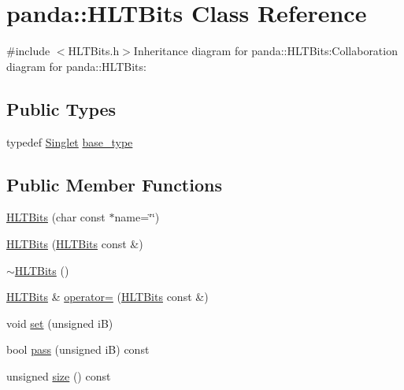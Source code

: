 \hypertarget{classpanda_1_1HLTBits}{
\section{panda::HLTBits Class Reference}
\label{classpanda_1_1HLTBits}
}


{\ttfamily \#include $<$HLTBits.h$>$}Inheritance diagram for panda::HLTBits:Collaboration diagram for panda::HLTBits:\subsection*{Public Types}
\begin{DoxyCompactItemize}
\item 
typedef \hyperlink{classpanda_1_1Singlet}{Singlet} \hyperlink{classpanda_1_1HLTBits_a0b3fb69a61a8c9ec407a7c066d40f5dc}{base\_\-type}
\end{DoxyCompactItemize}
\subsection*{Public Member Functions}
\begin{DoxyCompactItemize}
\item 
\hyperlink{classpanda_1_1HLTBits_a9bb54b0cde697b4eec5cdd529426d0aa}{HLTBits} (char const $\ast$name=\char`\"{}\char`\"{})
\item 
\hyperlink{classpanda_1_1HLTBits_a2e76e64099e3edcfb52f78b3be8dd85f}{HLTBits} (\hyperlink{classpanda_1_1HLTBits}{HLTBits} const \&)
\item 
\hyperlink{classpanda_1_1HLTBits_a13c03f7e4df98e675cfad89c5647f949}{$\sim$HLTBits} ()
\item 
\hyperlink{classpanda_1_1HLTBits}{HLTBits} \& \hyperlink{classpanda_1_1HLTBits_ac58854e1b3ad1889afb461326f9f6d1c}{operator=} (\hyperlink{classpanda_1_1HLTBits}{HLTBits} const \&)
\item 
void \hyperlink{classpanda_1_1HLTBits_a72a95b5d1c4edc2bc5500b473506f80e}{set} (unsigned iB)
\item 
bool \hyperlink{classpanda_1_1HLTBits_a308783549d0044824efc73b14cd5910f}{pass} (unsigned iB) const 
\item 
unsigned \hyperlink{classpanda_1_1HLTBits_a3f467c754dbbe34c1d9a063b6b29a925}{size} () const 
\end{DoxyCompactItemize}
